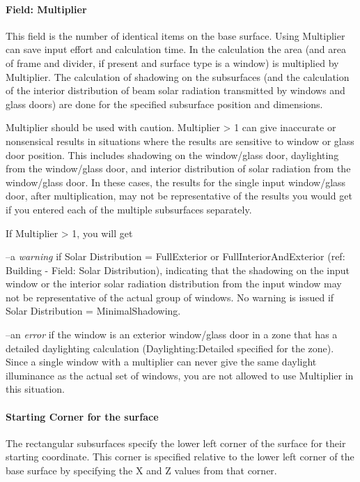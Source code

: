 \paragraph{Field: Multiplier}\label{field-multiplier-1}

This field is the number of identical items on the base surface. Using Multiplier can save input effort and calculation time. In the calculation the area (and area of frame and divider, if present and surface type is a window) is multiplied by Multiplier. The calculation of shadowing on the subsurfaces (and the calculation of the interior distribution of beam solar radiation transmitted by windows and glass doors) are done for the specified subsurface position and dimensions.

Multiplier should be used with caution. Multiplier \textgreater{} 1 can give inaccurate or nonsensical results in situations where the results are sensitive to window or glass door position. This includes shadowing on the window/glass door, daylighting from the window/glass door, and interior distribution of solar radiation from the window/glass door. In these cases, the results for the single input window/glass door, after multiplication, may not be representative of the results you would get if you entered each of the multiple subsurfaces separately.

If Multiplier \textgreater{} 1, you will get

--a \emph{warning} if Solar Distribution = FullExterior or FullInteriorAndExterior (ref: Building - Field: Solar Distribution), indicating that the shadowing on the input window or the interior solar radiation distribution from the input window may not be representative of the actual group of windows. No warning is issued if Solar Distribution = MinimalShadowing.

--an \emph{error} if the window is an exterior window/glass door in a zone that has a detailed daylighting calculation (Daylighting:Detailed specified for the zone). Since a single window with a multiplier can never give the same daylight illuminance as the actual set of windows, you are not allowed to use Multiplier in this situation.

\paragraph{Starting Corner for the surface}\label{starting-corner-for-the-surface-10}

The rectangular subsurfaces specify the lower left corner of the surface for their starting coordinate. This corner is specified relative to the lower left corner of the base surface by specifying the X and Z values from that corner.

